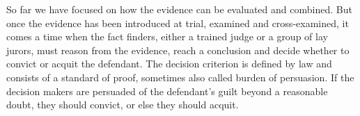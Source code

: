 \documentclass[10pt]{article}
\begin{document}
So far we have focused on how the evidence can be evaluated and combined. %
But once the evidence has been introduced at trial, examined and cross-examined, it comes a time when the fact finders, either a 
trained judge or a group of lay jurors, must reason from the evidence, reach a conclusion and decide 
whether to convict or acquit the defendant. 
%
The decision criterion is defined by law 
and consists of a standard of proof, sometimes also called burden of persuasion. 
 If the decision makers are persuaded of the defendant's guilt beyond a reasonable doubt, 
 they should convict, or else they should acquit. 
\end{document}
